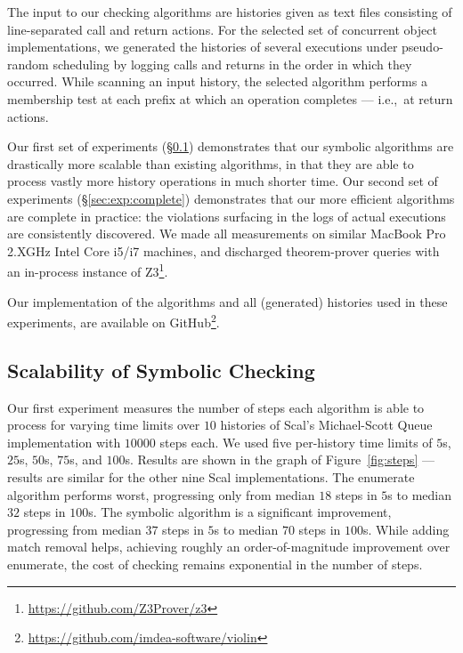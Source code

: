 The input to our checking algorithms are histories given as text files
consisting of line-separated call and return actions. For the selected set of
concurrent object implementations, we generated the histories of several
executions under pseudo-random scheduling by logging calls and returns in the
order in which they occurred. While scanning an input history, the selected
algorithm performs a membership test at each prefix at which an operation
completes --- i.e.,~at return actions.

Our first set of experiments (\S\ref{sec:exp:scalable}) demonstrates that our
symbolic algorithms are drastically more scalable than existing algorithms, in
that they are able to process vastly more history operations in much shorter
time. Our second set of experiments (\S\ref{sec:exp:complete}) demonstrates
that our more efficient algorithms are complete in practice: the violations
surfacing in the logs of actual executions are consistently discovered. We made
all measurements on similar MacBook Pro 2.XGHz Intel Core i5/i7 machines, and
discharged theorem-prover queries with an in-process instance of
Z3\footnote{\url{https://github.com/Z3Prover/z3}}.

Our implementation of the algorithms and all (generated) histories used in
these experiments, are available on
GitHub\footnote{\url{https://github.com/imdea-software/violin}}.

\subsection{Scalability of Symbolic Checking}
\label{sec:exp:scalable}

Our first experiment measures the number of steps each algorithm is able to
process for varying time limits over $10$ histories of Scal’s Michael-Scott
Queue implementation with $10000$ steps each. We used five per-history time
limits of $5$s, $25$s, $50$s, $75$s, and $100$s. Results are shown in the graph
of Figure~\ref{fig:steps} — results are similar for the other nine Scal
implementations. The {\sc enumerate} algorithm performs worst, progressing only
from median $18$ steps in $5$s to median $32$ steps in $100$s. The {\sc
symbolic} algorithm is a significant improvement, progressing from median $37$
steps in $5$s to median $70$ steps in $100$s. While adding match removal helps,
achieving roughly an order-of-magnitude improvement over {\sc enumerate}, the
cost of checking remains exponential in the number of steps.

